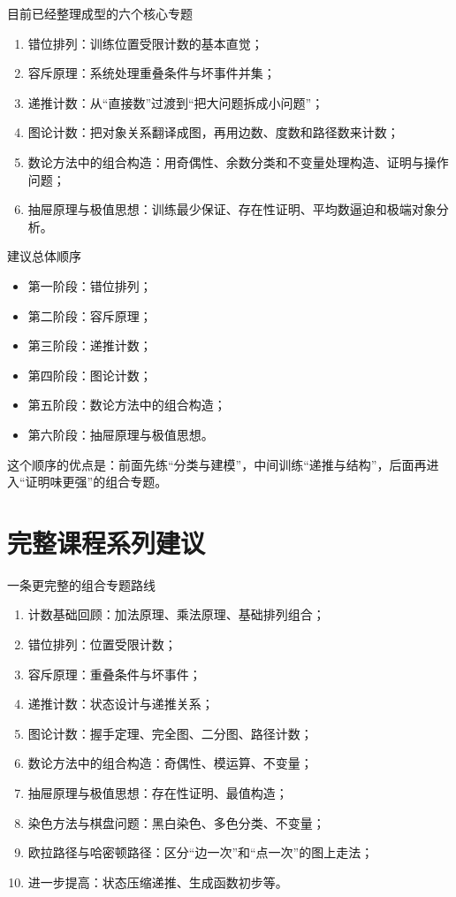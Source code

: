 \documentclass[11pt,a4paper,fontset=fandol]{ctexart}
\begin{document}
\begin{goalbox}{目前已经整理成型的六个核心专题}
\begin{enumerate}
  \item 错位排列：训练位置受限计数的基本直觉；
  \item 容斥原理：系统处理重叠条件与坏事件并集；
  \item 递推计数：从“直接数”过渡到“把大问题拆成小问题”；
  \item 图论计数：把对象关系翻译成图，再用边数、度数和路径数来计数；
  \item 数论方法中的组合构造：用奇偶性、余数分类和不变量处理构造、证明与操作问题；
  \item 抽屉原理与极值思想：训练最少保证、存在性证明、平均数逼迫和极端对象分析。
\end{enumerate}
\end{goalbox}

\begin{infobox}{建议总体顺序}
\begin{itemize}
  \item 第一阶段：错位排列；
  \item 第二阶段：容斥原理；
  \item 第三阶段：递推计数；
  \item 第四阶段：图论计数；
  \item 第五阶段：数论方法中的组合构造；
  \item 第六阶段：抽屉原理与极值思想。
\end{itemize}
这个顺序的优点是：前面先练“分类与建模”，中间训练“递推与结构”，后面再进入“证明味更强”的组合专题。
\end{infobox}

\section{完整课程系列建议}

\begin{goalbox}{一条更完整的组合专题路线}
\begin{enumerate}
  \item 计数基础回顾：加法原理、乘法原理、基础排列组合；
  \item 错位排列：位置受限计数；
  \item 容斥原理：重叠条件与坏事件；
  \item 递推计数：状态设计与递推关系；
  \item 图论计数：握手定理、完全图、二分图、路径计数；
  \item 数论方法中的组合构造：奇偶性、模运算、不变量；
  \item 抽屉原理与极值思想：存在性证明、最值构造；
  \item 染色方法与棋盘问题：黑白染色、多色分类、不变量；
  \item 欧拉路径与哈密顿路径：区分“边一次”和“点一次”的图上走法；
  \item 进一步提高：状态压缩递推、生成函数初步等。
\end{enumerate}
\end{goalbox}
\end{document}
